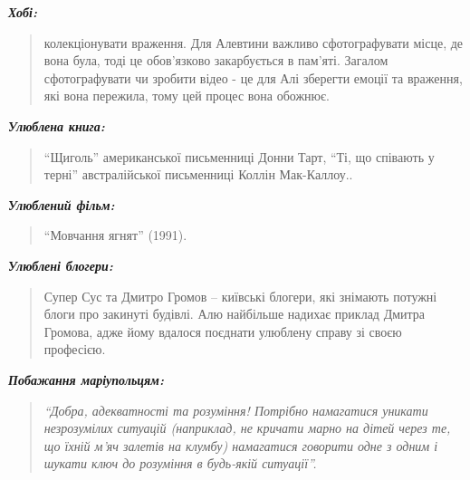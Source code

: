\emph{\textbf{Хобі:}} 

\begin{quote}
колекціонувати враження. Для Алевтини важливо сфотографувати місце, де
вона була, тоді це обов'язково закарбується в пам'яті. Загалом сфотографувати
чи зробити відео - це для Алі зберегти емоції та враження, які вона пережила,
тому цей процес вона обожнює.
\end{quote}

\emph{\textbf{Улюблена книга:}} 

\begin{quote}
\enquote{Щиголь} американської письменниці Донни Тарт, \enquote{Ті, що співають
у терні} австралійської письменниці Коллін Мак-Каллоу..
\end{quote}

\emph{\textbf{Улюблений фільм:}} 

\begin{quote}
\enquote{Мовчання ягнят} (1991).
\end{quote}

\emph{\textbf{Улюблені блогери:}} 

\begin{quote}
Супер Сус та Дмитро Громов – київські блогери, які знімають
потужні блоги про закинуті будівлі. Алю найбільше надихає приклад Дмитра
Громова, адже йому вдалося поєднати улюблену справу зі своєю професією.
\end{quote}

\emph{\textbf{Побажання маріупольцям:}} 

\begin{quote}
\em\enquote{Добра, адекватності та розуміння! Потрібно намагатися
уникати незрозумілих ситуацій (наприклад, не кричати марно на дітей через те,
що їхній м'яч залетів на клумбу) намагатися говорити одне з одним і шукати
ключ до розуміння в будь-якій ситуації}.
\end{quote}
